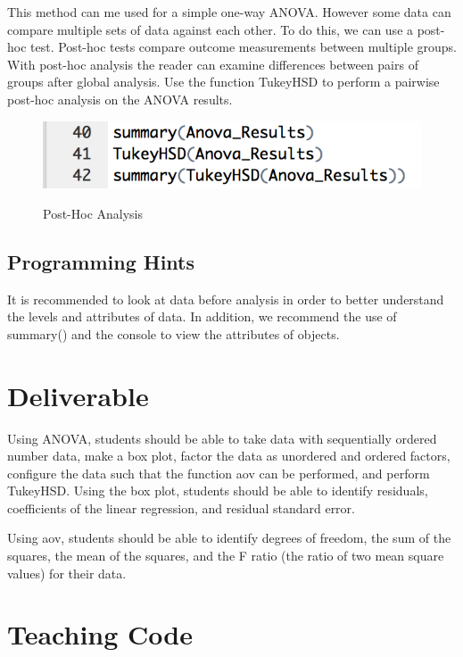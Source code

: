 \documentclass[11pt]{article}
\begin{document}
This method can me used for a simple one-way ANOVA. However some data can compare multiple sets of data against each other. To do this, we can use a post-hoc test. Post-hoc tests compare outcome measurements between multiple groups. With post-hoc analysis the reader can examine differences between pairs of groups after global analysis. Use the function TukeyHSD to perform a pairwise post-hoc analysis on the ANOVA results.
\begin{figure}[H] %
   \centering
      \caption{Post-Hoc Analysis}
   \includegraphics[scale=0.5]{tukey.png} 
   \label{fig:tukey}
\end{figure}

 \subsection{Programming Hints}
It is recommended to look at data before analysis in order to better understand the levels and attributes of data.
In addition, we recommend the use of summary() and the console to view the attributes of objects.
 

\section{Deliverable}

Using ANOVA, students should be able to take data with sequentially ordered number data, make a box plot, factor the data as unordered and ordered factors, configure the data such that the function aov can be performed, and perform TukeyHSD. Using the box plot, students should be able to identify residuals, coefficients of the linear regression, and residual standard error. 

Using aov, students should be able to identify degrees of freedom, the sum of the squares, the mean of the squares, and the F ratio (the ratio of two mean square values) for their data. 



\section{Teaching Code}
\end{document}
